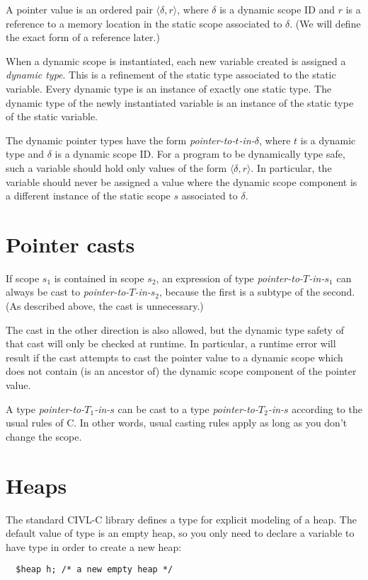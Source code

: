 \documentclass[11pt, oneside, letterpaper]{book}
\begin{document}
A pointer value is an ordered pair $\langle \delta,r \rangle$, where
$\delta$ is a dynamic scope ID and $r$ is a reference to a memory
location in the static scope associated to $\delta$.  (We will define
the exact form of a reference later.)

When a dynamic scope is instantiated, each new variable created is
assigned a \emph{dynamic type}.  This is a refinement of the static
type associated to the static variable.   Every dynamic type
is an instance of exactly one static type.  The dynamic
type of the newly instantiated variable is an instance of the
static type of the static variable.

The dynamic pointer types have the form
\emph{pointer-to-$t$-in-$\delta$}, where $t$ is a dynamic type and
$\delta$ is a dynamic scope ID.  For a program to be dynamically type
safe, such a variable should hold only values of the form $\langle
\delta, r\rangle$.  In particular, the variable should never be
assigned a value where the dynamic scope component is a different
instance of the static scope $s$ associated to $\delta$.

\section{Pointer casts}

If scope $s_1$ is contained in scope $s_2$, an expression of type
\emph{pointer-to-$T$-in-$s_1$} can always be cast to
\emph{pointer-to-$T$-in-$s_2$},
 because the first is a subtype of the second.  (As described above,
the cast is unnecessary.)  

The cast in the other direction is also allowed, but the dynamic type
safety of that cast will only be checked at runtime.  In particular, a
runtime error will result if the cast attempts to cast the pointer
value to a dynamic scope which does not contain (is an ancestor of)
the dynamic scope component of the pointer value.

A type \emph{pointer-to-$T_1$-in-$s$} can be cast to a type
\emph{pointer-to-$T_2$-in-$s$} according to the usual rules of C.  In
other words, usual casting rules apply as long as you don't change the
scope.



\section{Heaps}

The standard CIVL-C library defines a type \cheap{} for explicit
modeling of a heap.  The default value of \cheap{} type is an empty
heap, so you only need to declare a variable to have type \cheap{}
in order to create a new heap:
\begin{verbatim}
  $heap h; /* a new empty heap */
\end{verbatim}
\end{document}
